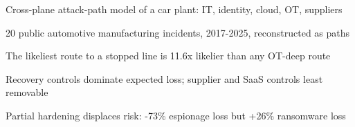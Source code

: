 \begin{highlights}
\item Cross-plane attack-path model of a car plant: IT, identity, cloud, OT, suppliers
\item 20 public automotive manufacturing incidents, 2017-2025, reconstructed as paths
\item The likeliest route to a stopped line is 11.6x likelier than any OT-deep route
\item Recovery controls dominate expected loss; supplier and SaaS controls least removable
\item Partial hardening displaces risk: -73\% espionage loss but +26\% ransomware loss
\end{highlights}
